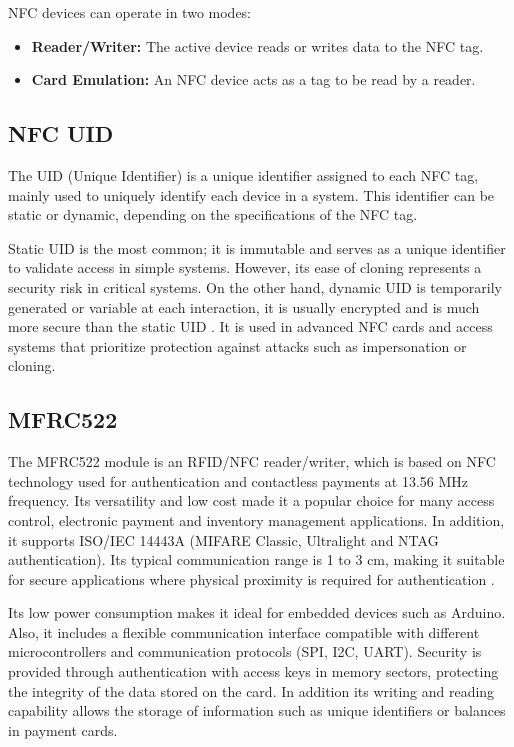 NFC devices can operate in two modes:

\begin{itemize}
	\item \textbf{Reader/Writer:} The active device reads or writes data to the NFC tag.
	\item \textbf{Card Emulation:} An NFC device acts as a tag to be read by a reader.
\end{itemize}


\subsection{NFC UID}
\label{subsec:nfc_uid}

The UID (Unique Identifier) is a unique identifier assigned to each NFC tag, mainly used to uniquely identify each device in a system. This identifier can be static or dynamic, depending on the specifications of the NFC tag.

Static UID is the most common; it is immutable and serves as a unique identifier to validate access in simple systems. However, its ease of cloning represents a security risk in critical systems. On the other hand, dynamic UID is temporarily generated or variable at each interaction, it is usually encrypted and is much more secure than the static UID \cite{ref13}. It is used in advanced NFC cards and access systems that prioritize protection against attacks such as impersonation or cloning.


\subsection{MFRC522}
\label{subsec:mfrc522}

The MFRC522 module is an RFID/NFC reader/writer, which is based on NFC technology used for authentication and contactless payments at 13.56 MHz frequency. Its versatility and low cost made it a popular choice for many access control, electronic payment and inventory management applications. In addition, it supports ISO/IEC 14443A (MIFARE Classic, Ultralight and NTAG authentication). Its typical communication range is 1 to 3 cm, making it suitable for secure applications where physical proximity is required for authentication \cite{Ref15}.

Its low power consumption makes it ideal for embedded devices such as Arduino. Also, it includes a flexible communication interface compatible with different microcontrollers and communication protocols (SPI, I2C, UART). Security is provided through authentication with access keys in memory sectors, protecting the integrity of the data stored on the card. In addition its writing and reading capability allows the storage of information such as unique identifiers or balances in payment cards.

